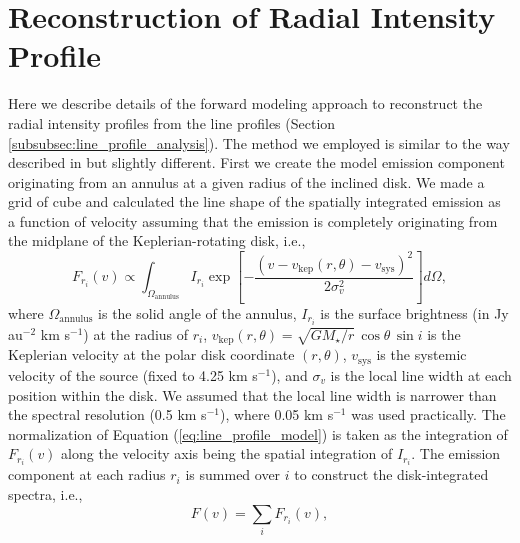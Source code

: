 \documentclass[twocolumn, twocolappendix, astrosymb, times]{aastex631}
\begin{document}
\section{Reconstruction of Radial Intensity Profile}\label{appendix:line_profile_analysis_method}
Here we describe details of the forward modeling approach to reconstruct the radial intensity profiles from the line profiles (Section \ref{subsubsec:line_profile_analysis}). The method we employed is similar to the way described in \citet{Bosman2021} but slightly different. First we create the model emission component originating from an annulus at a given radius of the inclined disk. We made a grid of cube and calculated the line shape of the spatially integrated emission as a function of velocity assuming that the emission is completely originating from the midplane of the Keplerian-rotating disk, i.e.,
\begin{equation}\label{eq:line_profile_model}
    F_{r_i}(v) \propto \int_{\Omega_\mathrm{annulus}}I_{r_i}\exp\left[- \frac{(v - v_\mathrm{kep}(r, \theta) - v_\mathrm{sys})^2}{2\sigma_v^2}\right]d\Omega,
\end{equation}
where $\Omega_\mathrm{annulus}$ is the solid angle of the annulus, $I_{r_i}$ is the surface brightness (in Jy au$^{-2}$ km s$^{-1}$) at the radius of $r_i$, $v_\mathrm{kep}(r, \theta) = \sqrt{GM_\star/r}\,\cos\theta\,\sin i$ is the Keplerian velocity at the polar disk coordinate $(r, \theta)$, $v_\mathrm{sys}$ is the systemic velocity of the source (fixed to 4.25 km s$^{-1}$), and $\sigma_v$ is the local line width at each position within the disk. We assumed that the local line width is narrower than the spectral resolution (0.5 km s$^{-1}$), where 0.05 km s$^{-1}$ was used practically. The normalization of Equation (\ref{eq:line_profile_model}) is taken as the integration of $F_{r_i}(v)$ along the velocity axis being the spatial integration of $I_{r_i}$. The emission component at each radius $r_i$ is summed over $i$ to construct the disk-integrated spectra, i.e., 
\begin{equation}
    F(v) = \sum_i F_{r_i}(v),
\end{equation}
\end{document}
